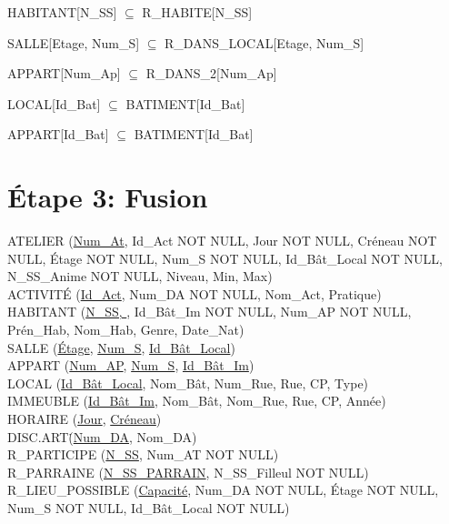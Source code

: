 \documentclass[a4paper,10.5pt]{report}
\begin{document}
	HABITANT[N\_SS] $\subseteq$ R\_HABITE[N\_SS]

	SALLE[Etage, Num\_S] $\subseteq$ R\_DANS\_LOCAL[Etage, Num\_S]

	APPART[Num\_Ap] $\subseteq$ R\_DANS\_2[Num\_Ap]

	LOCAL[Id\_Bat] $\subseteq$ BATIMENT[Id\_Bat]

	APPART[Id\_Bat] $\subseteq$ BATIMENT[Id\_Bat]

    \section*{Étape 3: Fusion}

	ATELIER (\underline{Num\_At}, Id\_Act NOT NULL, Jour NOT NULL, Créneau NOT NULL, Étage NOT NULL, Num\_S NOT NULL, Id\_Bât\_Local NOT NULL, N\_SS\_Anime NOT NULL, Niveau, Min, Max) \\

	ACTIVITÉ (\underline{Id\_Act}, Num\_DA NOT NULL, Nom\_Act, Pratique) \\

	HABITANT (\underline{N\_SS, }, Id\_Bât\_Im NOT NULL, Num\_AP NOT NULL, Prén\_Hab, Nom\_Hab, Genre, Date\_Nat)  \\

	SALLE (\underline{Étage}, \underline{Num\_S}, \underline{Id\_Bât\_Local}) \\

	APPART (\underline{Num\_AP}, \underline{Num\_S}, \underline{Id\_Bât\_Im}) \\

	LOCAL (\underline{Id\_Bât\_Local}, Nom\_Bât, Num\_Rue, Rue, CP, Type) \\

	IMMEUBLE (\underline{Id\_Bât\_Im}, Nom\_Bât, Nom\_Rue, Rue, CP, Année) \\

	HORAIRE (\underline{Jour}, \underline{Créneau}) \\

	DISC.ART\. (\underline{Num\_DA}, Nom\_DA) \\

	R\_PARTICIPE (\underline{N\_SS}, Num\_AT NOT NULL) \\

	R\_PARRAINE (\underline{N\_SS\_PARRAIN}, N\_SS\_Filleul NOT NULL) \\

	R\_LIEU\_POSSIBLE (\underline{Capacité}, Num\_DA NOT NULL, Étage NOT NULL, Num\_S NOT NULL, Id\_Bât\_Local NOT NULL) \\
\end{document}

